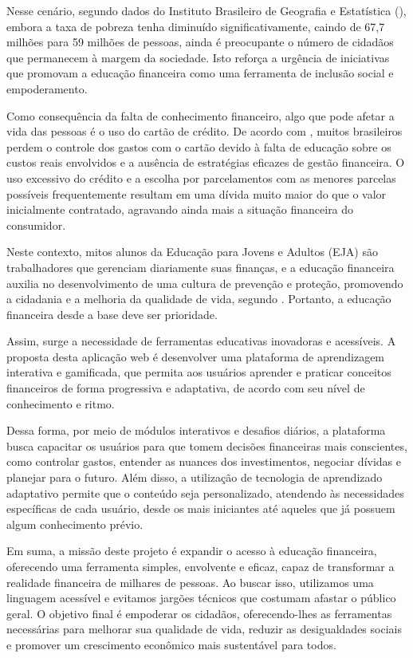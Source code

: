\documentclass[
	article,			%
	12pt,				%
	oneside,			%
	a4paper,			%
	english,			%
	brazil,				%
	sumario=tradicional
	]{abntex2}
\begin{document}
Nesse cenário, segundo dados do Instituto Brasileiro de Geografia e Estatística (), embora a taxa de pobreza tenha diminuído significativamente, caindo de 67,7 milhões para 59 milhões de pessoas, ainda é preocupante o número de cidadãos que permanecem à margem da sociedade. Isto reforça a urgência de iniciativas que promovam a educação financeira como uma ferramenta de inclusão social e empoderamento.

Como consequência da falta de conhecimento financeiro, algo que pode afetar a vida das pessoas é o uso do cartão de crédito. De acordo com , muitos brasileiros perdem o controle dos gastos com o cartão devido à falta de educação sobre os custos reais envolvidos e a ausência de estratégias eficazes de gestão financeira. O uso excessivo do crédito e a escolha por parcelamentos com as menores parcelas possíveis frequentemente resultam em uma dívida muito maior do que o valor inicialmente contratado, agravando ainda mais a situação financeira do consumidor.

Neste contexto, mitos alunos da Educação para Jovens e Adultos (EJA) são trabalhadores que gerenciam diariamente suas finanças, e a educação financeira auxilia no desenvolvimento de uma cultura de prevenção e proteção, promovendo a cidadania e a melhoria da qualidade de vida, segundo . Portanto, a educação financeira desde a base deve ser prioridade.

Assim, surge a necessidade de ferramentas educativas inovadoras e acessíveis. A proposta desta aplicação web é desenvolver uma plataforma de aprendizagem interativa e gamificada, que permita aos usuários aprender e praticar conceitos financeiros de forma progressiva e adaptativa, de acordo com seu nível de conhecimento e ritmo.

Dessa forma, por meio de módulos interativos e desafios diários, a plataforma busca capacitar os usuários para que tomem decisões financeiras mais conscientes, como controlar gastos, entender as nuances dos investimentos, negociar dívidas e planejar para o futuro. Além disso, a utilização de tecnologia de aprendizado adaptativo permite que o conteúdo seja personalizado, atendendo às necessidades específicas de cada usuário, desde os mais iniciantes até aqueles que já possuem algum conhecimento prévio.

Em suma, a missão deste projeto é expandir o acesso à educação financeira, oferecendo uma ferramenta simples, envolvente e eficaz, capaz de transformar a realidade financeira de milhares de pessoas. Ao buscar isso, utilizamos uma linguagem acessível e evitamos jargões técnicos que costumam afastar o público geral. O objetivo final é empoderar os cidadãos, oferecendo-lhes as ferramentas necessárias para melhorar sua qualidade de vida, reduzir as desigualdades sociais e promover um crescimento econômico mais sustentável para todos.
\end{document}
